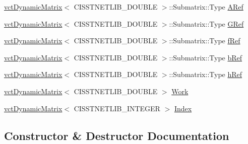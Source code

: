 \begin{DoxyCompactItemize}
\item 
\hyperlink{classvct_dynamic_matrix}{vct\+Dynamic\+Matrix}$<$ C\+I\+S\+S\+T\+N\+E\+T\+L\+I\+B\+\_\+\+D\+O\+U\+B\+L\+E $>$\+::Submatrix\+::\+Type \hyperlink{classnmr_l_s_e_i_solver_aec36ff37069c0f838c9cf92b8ab607b9}{A\+Ref}
\item 
\hyperlink{classvct_dynamic_matrix}{vct\+Dynamic\+Matrix}$<$ C\+I\+S\+S\+T\+N\+E\+T\+L\+I\+B\+\_\+\+D\+O\+U\+B\+L\+E $>$\+::Submatrix\+::\+Type \hyperlink{classnmr_l_s_e_i_solver_ac4742f5e6f42cd0cc63f00b70a26a84f}{G\+Ref}
\item 
\hyperlink{classvct_dynamic_matrix}{vct\+Dynamic\+Matrix}$<$ C\+I\+S\+S\+T\+N\+E\+T\+L\+I\+B\+\_\+\+D\+O\+U\+B\+L\+E $>$\+::Submatrix\+::\+Type \hyperlink{classnmr_l_s_e_i_solver_abecdcb81cac955ea6a1f36eb305fb13f}{f\+Ref}
\item 
\hyperlink{classvct_dynamic_matrix}{vct\+Dynamic\+Matrix}$<$ C\+I\+S\+S\+T\+N\+E\+T\+L\+I\+B\+\_\+\+D\+O\+U\+B\+L\+E $>$\+::Submatrix\+::\+Type \hyperlink{classnmr_l_s_e_i_solver_a379afee982530ff5d7d0c60b6b1a71d6}{b\+Ref}
\item 
\hyperlink{classvct_dynamic_matrix}{vct\+Dynamic\+Matrix}$<$ C\+I\+S\+S\+T\+N\+E\+T\+L\+I\+B\+\_\+\+D\+O\+U\+B\+L\+E $>$\+::Submatrix\+::\+Type \hyperlink{classnmr_l_s_e_i_solver_a36515975cc4d9e31a1f44a9c008e5c3a}{h\+Ref}
\item 
\hyperlink{classvct_dynamic_matrix}{vct\+Dynamic\+Matrix}$<$ C\+I\+S\+S\+T\+N\+E\+T\+L\+I\+B\+\_\+\+D\+O\+U\+B\+L\+E $>$ \hyperlink{classnmr_l_s_e_i_solver_a94fbd24b049a1561921e78657ed07646}{Work}
\item 
\hyperlink{classvct_dynamic_matrix}{vct\+Dynamic\+Matrix}$<$ C\+I\+S\+S\+T\+N\+E\+T\+L\+I\+B\+\_\+\+I\+N\+T\+E\+G\+E\+R $>$ \hyperlink{classnmr_l_s_e_i_solver_a1cc899c7154c60c279bfa6ffe2f836a3}{Index}
\end{DoxyCompactItemize}


\subsection{Constructor \& Destructor Documentation}
\hypertarget{classnmr_l_s_e_i_solver_a6e7f8748f3a8698d5de14e9b5040bbb5}{}
